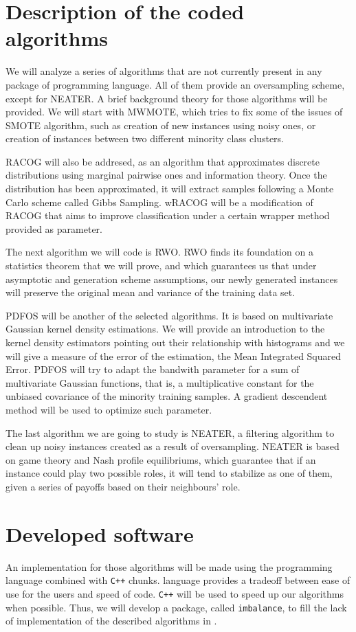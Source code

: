 \section*{Description of the coded algorithms}

We will analyze a series of algorithms that are not currently present in any package of \R programming language. All of
them provide an oversampling scheme, except for NEATER. A brief background theory for those algorithms will be provided.
We will start with MWMOTE, which tries to fix some of the issues of SMOTE algorithm, such as creation of new instances 
using noisy ones, or creation of instances between two different minority class clusters.

RACOG will also be addresed, as an algorithm that approximates discrete distributions using marginal pairwise ones and 
information theory. Once the distribution has been approximated, it will extract samples following a Monte Carlo scheme
called Gibbs Sampling. wRACOG will be a modification of RACOG that aims to improve classification under a certain wrapper
method provided as parameter.

The next algorithm we will code is RWO. RWO finds its foundation on a statistics theorem that we will prove, and which guarantees
us that under asymptotic and generation scheme assumptions, our newly generated instances will preserve the original mean
and variance of the training data set.

PDFOS will be another of the selected algorithms. It is based on multivariate Gaussian kernel density estimations. We will
provide an introduction to the kernel density estimators pointing out their relationship with histograms and we will give
a measure of the error of the estimation, the Mean Integrated Squared Error. PDFOS will try to adapt the bandwith parameter
for a sum of multivariate Gaussian functions, that is, a multiplicative constant for the unbiased covariance of the minority
training samples. A gradient descendent method will be used to optimize such parameter.

The last algorithm we are going to study is NEATER, a filtering algorithm to clean up noisy instances created as a result of
oversampling. NEATER is based on game theory and Nash profile equilibriums, which guarantee that if an instance could play
two possible roles, it will tend to stabilize as one of them, given a series of payoffs based on their neighbours' role.

\section*{Developed software}
An implementation for those algorithms will be made using the \R programming language combined with \texttt{C++} chunks. 
\R language provides a tradeoff between ease of use for the users and speed of code. \texttt{C++} will be used to 
speed up our algorithms when possible. Thus, we will develop a package, called \texttt{imbalance}, to fill the lack of implementation of the 
described algorithms in \R.

